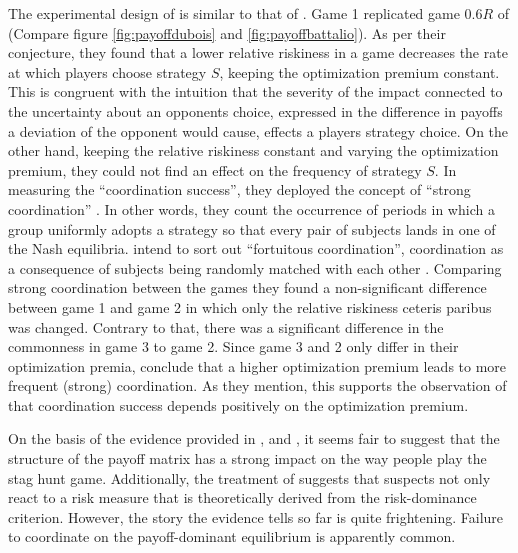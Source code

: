 The experimental design of \textcite{dubois_optimization_2012} is similar
to that of \textcite{battalio_optimization_2001}.
Game 1 replicated game $0.6R$  of \textcite{battalio_optimization_2001}  
(Compare figure \ref{fig:payoffdubois} and \ref{fig:payoffbattalio}). 
As per their conjecture, they found that a lower relative riskiness 
in a game decreases the rate at which players choose strategy $S$, 
keeping the optimization premium constant. This is congruent with 
the intuition that the severity of the impact connected to the uncertainty
about an opponents choice, expressed in
the difference in payoffs a deviation of the opponent would cause,
effects a players strategy choice. 
On the other hand, keeping the relative riskiness constant and varying the
optimization premium, they could not find an effect on the frequency of 
strategy $S$. 
In measuring the ``coordination success'', they deployed the concept of ``strong
coordination'' \parencite{dubois_optimization_2012}. 
In other words, they count the occurrence of periods in which a group
uniformly adopts a strategy so that every pair of subjects lands in one
of the Nash equilibria. \textcite{dubois_optimization_2012} intend to sort 
out ``fortuitous coordination'', coordination as a consequence of subjects being
randomly matched with each other \parencite[373]{dubois_optimization_2012}.
Comparing strong coordination between the games they found a non-significant 
difference between game 1 and game 2 in which only the relative riskiness 
ceteris paribus was changed. Contrary to that, there was a significant 
difference in the commonness in game 3 to game 2.
Since game 3 and 2 only differ in their optimization premia, 
\textcite{dubois_optimization_2012} conclude that a higher optimization
premium leads to more frequent (strong) coordination. 
As they mention, this supports the observation of 
\textcite{battalio_optimization_2001} that coordination success depends 
positively on the optimization premium. 

On the basis of the evidence provided in \textcite{battalio_optimization_2001},
\textcite{schmidt_playing_2003} and \textcite{dubois_optimization_2012},
it seems fair to suggest that the structure of the payoff matrix has a 
strong impact on the way people play the stag hunt game. Additionally, 
the treatment of \textcite{dubois_optimization_2012} suggests that suspects 
not only react to a risk measure that is theoretically derived from the
risk-dominance criterion.
However, the story the evidence tells so far is quite frightening. 
Failure to coordinate on the payoff-dominant equilibrium is apparently common. 

